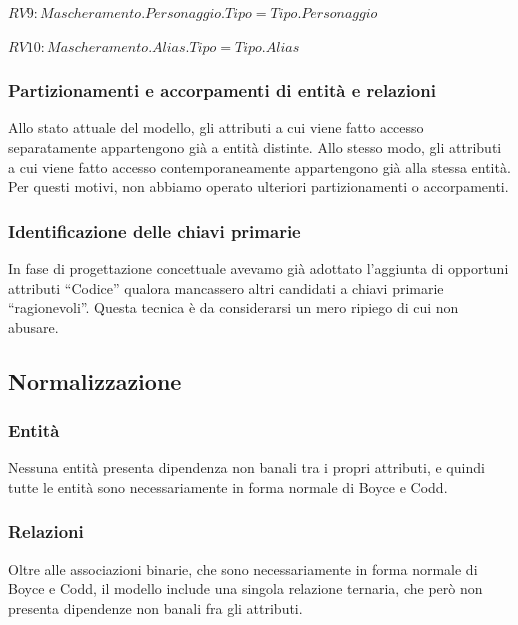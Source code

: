 \documentclass{article}
\begin{document}
\begin{math}
	RV9: Mascheramento.Personaggio.Tipo = Tipo.Personaggio
\end{math}

\begin{math}
	RV10: Mascheramento.Alias.Tipo = Tipo.Alias
\end{math}

\subsubsection{Partizionamenti e accorpamenti di entità e relazioni}

Allo stato attuale del modello, gli attributi a cui viene fatto accesso
separatamente appartengono già a entità distinte. Allo stesso modo, gli
attributi a cui viene fatto accesso contemporaneamente appartengono già alla
stessa entità. Per questi motivi, non abbiamo operato ulteriori partizionamenti
o accorpamenti.


\subsubsection{Identificazione delle chiavi primarie}

In fase di progettazione concettuale avevamo già adottato l'aggiunta di
opportuni attributi ``Codice'' qualora mancassero altri candidati a chiavi
primarie ``ragionevoli''. Questa tecnica è da considerarsi un mero ripiego di cui
non abusare.

\subsection{Normalizzazione}

\subsubsection{Entità}

Nessuna entità presenta dipendenza non banali tra i propri attributi, e quindi
tutte le entità sono necessariamente in forma normale di Boyce e Codd.

\subsubsection{Relazioni}

Oltre alle associazioni binarie, che sono necessariamente in forma normale di
Boyce e Codd, il modello include una singola relazione ternaria, che però non
presenta dipendenze non banali fra gli attributi.
\end{document}
